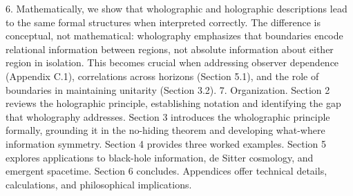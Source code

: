 ﻿\documentclass[12pt]{article}
\begin{document}
6.
Mathematically, we show that wholographic and holographic descriptions lead to the same formal structures when interpreted correctly. The difference is conceptual, not mathematical: wholography emphasizes that boundaries encode relational information between regions, not absolute information about either region in isolation. This becomes crucial when addressing observer dependence (Appendix C.1), correlations across horizons (Section 5.1), and the role of boundaries in maintaining unitarity (Section 3.2).
7. Organization.
Section 2 reviews the holographic principle, establishing notation and identifying the gap that wholography addresses. Section 3 introduces the wholographic principle formally, grounding it in the no-hiding theorem and developing what-where information symmetry. Section 4 provides three worked examples. Section 5 explores applications to black-hole information, de Sitter cosmology, and emergent spacetime. Section 6 concludes. Appendices offer technical details, calculations, and philosophical implications.
\end{document}
